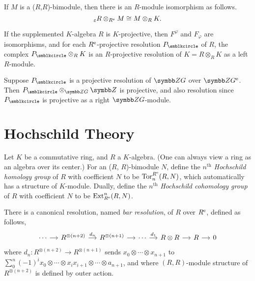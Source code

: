 \begin{lemma}
  If $M$ is a ($R$,$R$)-bimodule, then there is an $R$-module isomorphism as follows.
  \begin{equation*}
    {}_{\varepsilon}R\otimes_{R^{\textrm{e}}}M\cong M\otimes_{R}K.
  \end{equation*}
\end{lemma}

\begin{theorem}
  If the supplemented $K$-algebra $R$ is $K$-projective, then $F^\varphi$ and $F_\varphi$ are isomorphisms, and for each $R^{\textrm{e}}$-projective resolution $P_{\CCCIR}$ of $R$, the complex $P_{\CCCIR}\otimes_{R} K$ is an $R$-projective resolution of $K=R\otimes_R K$ as a left $R$-module.
\end{theorem}

Suppose $P_\CCCIR$ is a projective resolution of $\ZG$ over $\ZG^{\ENV}$. Then $P_\CCCIR\otimes_{\ZG}\ZZ$ is projective, and also resolution since $P_\CCCIR$ is projective as a right $\ZG$-module.

\section{Hochschild Theory}

Let $K$ be a commutative ring, and $R$ a $K$-algebra. (One can always view a ring as an algebra over its center.) For an ($R$, $R$)-bimodule $N$, define the $n^{\text{th}}$ \emph{Hochschild homology group} of $R$ with coefficient $N$ to be $\operatorname{Tor}_n^{R^{\textrm{e}}}(R, N)$, which automatically has a structure of $K$-module. Dually, define the $n^{\text{th}}$ \emph{Hochschild cohomology group} of $R$ with coefficient $N$ to be $\operatorname{Ext}^n_{R^{\textrm{e}}}(R, N)$.

There is a canonical resolution, named \emph{bar resolution}, of $R$ over $R^{\textrm{e}}$, defined as follows,
\begin{equation*}
  \begin{tikzcd}[sep=small]
    \dotsb & R^{\otimes(n+2)} & R^{\otimes(n+1)} & \dotsb & R\otimes R & R & 0
    \arrow[from=1-1,]{1-2}[]{}
    \arrow[from=1-2,]{1-3}[]{d_n}
    \arrow[from=1-3,]{1-4}[]{}
    \arrow[from=1-4,]{1-5}[]{d_1}
    \arrow[from=1-5,]{1-6}[]{}
    \arrow[from=1-6,]{1-7}[]{}
  \end{tikzcd}
\end{equation*}
where $d_n\colon R^{\otimes(n+2)} \to R^{\otimes(n+1)}$ sends $x_0\otimes\dotsb\otimes x_{n+1}$ to $\sum_{0}^n (-1)^ix_0\otimes\dotsb \otimes x_ix_{i+1}\otimes\dotsb\otimes a_{n+1}$, and where $(R, R)$-module structure of $R^{\otimes(n+2)}$ is defined by outer action.

